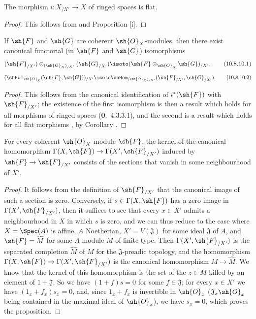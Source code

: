 \begin{corollary}[10.8.9]
\label{I.10.8.9}
The morphism $i:X_{/X'}\to X$ of ringed spaces is flat.
\end{corollary}

\begin{proof}
This follows from  and Proposition [i].
\end{proof}

\begin{corollary}[10.8.10]
\label{I.10.8.10}
If $\sh{F}$ and $\sh{G}$ are coherent $\sh{O}_X$-modules, then there exist canonical functorial (in $\sh{F}$ and $\sh{G}$) isomorphisms
\[
\label{I.10.8.10.1}
  (\sh{F}_{/X'})\otimes_{(\sh{O}_X)_{/X'}}(\sh{G}_{/X'})\isoto(\sh{F}\otimes_{\sh{O}_X}\sh{G})_{/X'},
  \tag{10.8.10.1}
\]
\[
\label{I.10.8.10.2}
  (\shHom_{\sh{O}_X}(\sh{F},\sh{G}))_{/X'}\isoto\shHom_{(\sh{O}_X)_{/X'}}(\sh{F}_{/X'},\sh{G}_{/X'}).
  \tag{10.8.10.2}
\]
\end{corollary}

\begin{proof}
This follows from the canonical identification of $i^*(\sh{F})$ with $\sh{F}_{/X'}$; the existence of the first isomorphism is then a result which holds for all morphisms of ringed spaces (\textbf{0},~4.3.3.1), and the second is a result which holds for all flat morphisms , by Corollary .
\end{proof}

\begin{proposition}[10.8.11]
\label{I.10.8.11}
For every coherent $\sh{O}_X$-module $\sh{F}$, the kernel of the canonical homomorphism $\Gamma(X,\sh{F})\to\Gamma(X',\sh{F}_{/X'})$ induced by $\sh{F}\to\sh{F}_{/X'}$ consists of the sections that vanish in some neighbourhood of $X'$.
\end{proposition}

\begin{proof}
It follows from the definition of $\sh{F}_{/X'}$ that the canonical image of such a section is zero.
Conversely, if $s\in\Gamma(X,\sh{F})$ has a zero image in $\Gamma(X',\sh{F}_{/X'})$, then it suffices to see that every $x\in X'$ admits a neighbourhood in $X$ in which $s$ is zero, and we can thus reduce to the case where $X=\Spec(A)$ is affine, $A$ Noetherian, $X'=V(\mathfrak{J})$ for some ideal $\mathfrak{J}$ of $A$, and $\sh{F}=\widetilde{M}$ for some $A$-module $M$ of finite type.
Then $\Gamma(X',\sh{F}_{/X'})$ is the separated completion $\widehat{M}$ of $M$ for the $\mathfrak{J}$-preadic topology, and the homomorphism $\Gamma(X,\sh{F})\to\Gamma(X',\sh{F}_{/X'})$ is the canonical homomorphism $M\to\widehat{M}$.
We know  that the kernel of this homomorphism is the set of the $z\in M$ killed by an element of $1+\mathfrak{J}$.
So we have $(1+f)s=0$ for some $f\in\mathfrak{J}$; for every $x\in X'$ we have $(1_x+f_x)s_x=0$, and, since $1_x+f_x$ is invertible in $\sh{O}_x$ ($\mathfrak{J}_x\sh{O}_x$ being contained in the maximal ideal of $\sh{O}_x$), we have $s_x=0$, which proves the proposition.
\end{proof}

